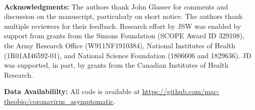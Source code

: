 \mbox{}\\
\noindent
\textbf{Acknowledgments:} The authors thank John Glasser for comments
and discussion on the manuscript, particularly on short notice. 
The authors thank multiple reviewers for their feedback.
Research effort by JSW was enabled
by support from grants from the Simons Foundation (SCOPE Award ID 329108), the Army Research
Office (W911NF1910384), National Institutes of Health (1R01AI46592-01),
and National Science Foundation (1806606 and 1829636). JD was supported, in part, by
grants from the Canadian Institutes of Health Research.

\noindent
\textbf{Data Availabililty:} All code is available at \url{https://github.com/mac-theobio/coronavirus_asymptomatic}.

